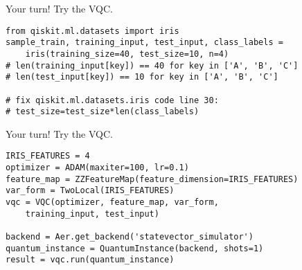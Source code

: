 \begin{frame}[fragile]{Your turn!}
Try the VQC. \bigskip

\begin{verbatim}
from qiskit.ml.datasets import iris
sample_train, training_input, test_input, class_labels = 
    iris(training_size=40, test_size=10, n=4)
# len(training_input[key]) == 40 for key in ['A', 'B', 'C']
# len(test_input[key]) == 10 for key in ['A', 'B', 'C']

# fix qiskit.ml.datasets.iris code line 30: 
# test_size=test_size*len(class_labels)
\end{verbatim}
\end{frame}



\begin{frame}[fragile]{Your turn!}
Try the VQC. \bigskip

\begin{verbatim}
IRIS_FEATURES = 4
optimizer = ADAM(maxiter=100, lr=0.1)
feature_map = ZZFeatureMap(feature_dimension=IRIS_FEATURES)
var_form = TwoLocal(IRIS_FEATURES)
vqc = VQC(optimizer, feature_map, var_form, 
    training_input, test_input)

backend = Aer.get_backend('statevector_simulator')
quantum_instance = QuantumInstance(backend, shots=1)
result = vqc.run(quantum_instance)
\end{verbatim}
\end{frame}
